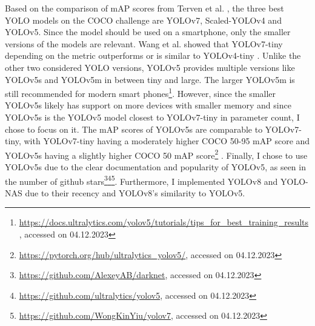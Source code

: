 \documentclass[10pt]{book}
\begin{document}
Based on the comparison of \ac{mAP} scores from Terven et al. \cite{terven2023comprehensive}, the three best \ac{YOLO} models on the \ac{COCO} challenge are \ac{YOLO}v7, Scaled-\ac{YOLO}v4 and \ac{YOLO}v5. 
Since the model should be used on a smartphone, only the smaller versions of the models are relevant. Wang et al. showed that \ac{YOLO}v7-tiny depending on the metric outperforms or is similar to \ac{YOLO}v4-tiny \cite{wang2023yolov7}. 
Unlike the other two considered \ac{YOLO} versions, \ac{YOLO}v5 provides multiple versions like \ac{YOLO}v5s and \ac{YOLO}v5m in between tiny and large. 
The larger \ac{YOLO}v5m is still recommended for modern smart phones\footnote{\url{https://docs.ultralytics.com/yolov5/tutorials/tips\_for\_best\_training\_results}, accessed on 04.12.2023}. 
However, since the smaller \ac{YOLO}v5s likely has support on more devices with smaller memory and since \ac{YOLO}v5s is the \ac{YOLO}v5 model closest to \ac{YOLO}v7-tiny in parameter count, I chose to focus on it. %
The \ac{mAP} scores of \ac{YOLO}v5s are comparable to \ac{YOLO}v7-tiny, with \ac{YOLO}v7-tiny having a moderately higher \ac{COCO} 50-95 \ac{mAP} score and \ac{YOLO}v5s having a slightly higher \ac{COCO} 50 \ac{mAP} score\footnote{\url{https://pytorch.org/hub/ultralytics_yolov5/}, accessed on 04.12.2023} \cite{wang2023yolov7}. 
Finally, I chose to use \ac{YOLO}v5s due to the clear documentation and popularity of \ac{YOLO}v5, as seen in the number of github stars\footnote{\url{https://github.com/AlexeyAB/darknet}, accessed on 04.12.2023}\footnote{\url{https://github.com/ultralytics/yolov5}, accessed on 04.12.2023}\footnote{\url{https://github.com/WongKinYiu/yolov7}, accessed on 04.12.2023}. Furthermore, I implemented \ac{YOLO}v8 and \ac{YOLO}-NAS due to their recency and \ac{YOLO}v8's similarity to \ac{YOLO}v5.

\end{document}
